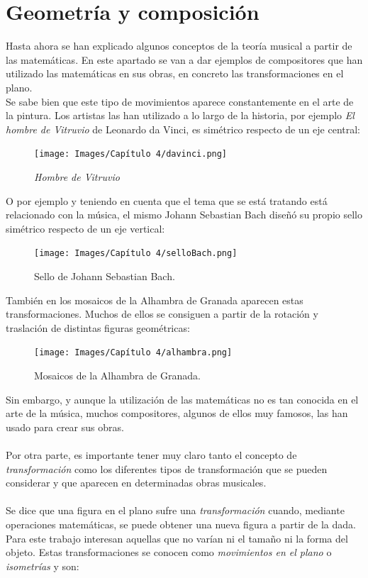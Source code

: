 \documentclass[a4paper, openright, 11pt, titlepage]{report}
\theoremstyle{definition}\newtheorem{defin}[propo]{Definition}
\theoremstyle{definition}\newtheorem{obser}[propo]{Remark}
\theoremstyle{definition}\newtheorem{ejem}[propo]{Ejemplo}
\theoremstyle{definition}\newtheorem{algoritmo}[propo]{Algoritmo}
\begin{document}
\section{Geometría y composición}
Hasta ahora se han explicado algunos conceptos de la teoría musical a partir de las matemáticas. En este apartado se van a dar ejemplos de compositores que han utilizado las matemáticas en sus obras, en concreto las transformaciones en el plano.\\ Se sabe bien que este tipo de movimientos aparece constantemente en el arte de la pintura. Los artistas las han utilizado a lo largo de la historia, por ejemplo \textit{El hombre de Vitruvio} de Leonardo da Vinci, es simétrico respecto de un eje central:
\begin{figure}[H]
    \centering
    \texttt{[image: Images/Capítulo 4/davinci.png]}
    \caption{\textit{Hombre de Vitruvio}}
\end{figure}
O por ejemplo y teniendo en cuenta que el tema que se está tratando está relacionado con la música, el mismo Johann Sebastian Bach diseñó su propio sello simétrico respecto de un eje vertical: 
\begin{figure}[H]
    \centering
    \texttt{[image: Images/Capítulo 4/selloBach.png]}
    \caption{Sello de Johann Sebastian Bach.}
\end{figure}
También en los mosaicos de la Alhambra de Granada aparecen estas transformaciones. Muchos de ellos se consiguen a partir de la rotación y traslación de distintas figuras geométricas:
\begin{figure}[H]
    \centering
    \texttt{[image: Images/Capítulo 4/alhambra.png]}
    \caption{Mosaicos de la Alhambra de Granada.}
\end{figure}
Sin embargo, y aunque la utilización de las matemáticas no es tan conocida en el arte de la música, muchos compositores, algunos de ellos muy famosos, las han usado para crear sus obras.\\\\
Por otra parte, es importante tener muy claro tanto el concepto de \textit{transformación} como los diferentes tipos de transformación que se pueden considerar y que aparecen en determinadas obras musicales.\\\\
Se dice que una figura en el plano sufre una \textit{transformación} cuando, mediante operaciones matemáticas, se puede obtener una nueva figura a partir de la dada. Para este trabajo interesan aquellas que no varían ni el tamaño ni la forma del objeto. Estas transformaciones se conocen como \textit{movimientos en el plano} o \textit{isometrías} y son:
\end{document}

